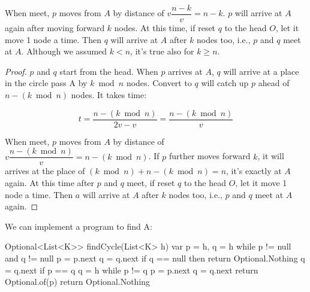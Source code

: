 \documentclass[b5paper]{article}
\begin{document}
\begin{Answer}[ref = {ex:list-others}]
{\begin{center}
\label{fig:circular-catching}
\end{center}

When meet, $p$ moves from $A$ by distance of $v\dfrac{n-k}{v} = n - k$. $p$ will arrive at $A$ again after moving forward $k$ nodes. At this time, if reset $q$ to the head $O$, let it move 1 node a time. Then $q$ will arrive at $A$ after $k$ nodes too, i.e., $p$ and $q$ meet at $A$. Although we assumed $k < n$, it's true also for $k \geq n$.

\begin{proof}
$p$ and $q$ start from the head. When $p$ arrives at $A$, $q$ will arrive at a place in the circle pass A by $k \bmod n$ nodes. Convert to $q$ will catch up $p$ ahead of $n - (k \bmod n)$ nodes. It takes time:

\[
t = \dfrac{n - (k \bmod n)}{2v - v} = \dfrac{n - (k \bmod n)}{v}
\]

When meet, $p$ moves from $A$ by distance of $v\dfrac{n - (k \bmod n)}{v} = n - (k \bmod n)$. If $p$ further moves forward $k$, it will arrives at the place of $(k \bmod n) + n - (k \bmod n) = n$, it's exactly at $A$ again. At this time after $p$ and $q$ meet, if reset $q$ to the head $O$, let it move 1 node a time. Then $a$ will arrive at $A$ after $k$ nodes too, i.e., $p$ and $q$ meet at $A$ again.
\end{proof}

We can implement a program to find A:

\begin{Bourbaki}
Optional<List<K>> findCycle(List<K> h) {
    var p = h, q = h
    while p != null and q != null {
        p = p.next
        q = q.next
        if q == null then return Optional.Nothing
        q = q.next
        if p == q {
            q = h
            while p != q {
                p = p.next
                q = q.next
            }
            return Optional.of(p)
        }
    }
    return Optional.Nothing
}
\end{Bourbaki}
}
\end{Answer}
\end{document}

